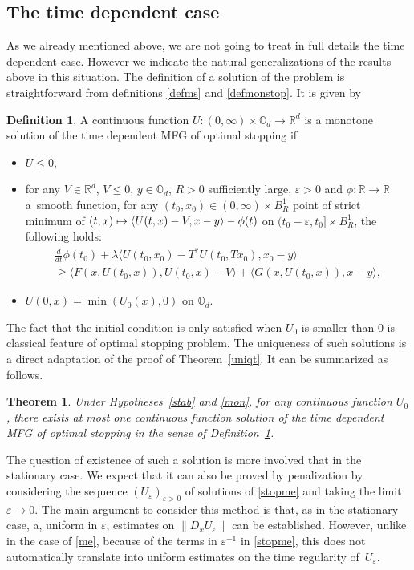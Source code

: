 \documentclass[10pt]{amsart}
\newcommand\mto{\mathchoice{\longmapsto}{\mapsto}{\mapsto}{\mapsto}}
\let\epsilon\varepsilon
\newtheorem{Theorem}{Theorem}[section]
\theoremstyle{definition}
\newtheorem{Def}{Definition}[section]
\begin{document}
\subsection{The time dependent case}
As we already mentioned above, we are not going to treat in full details the time dependent case. However we indicate the natural generalizations of the results above in this situation. The definition of a solution of the problem is straightforward from definitions \ref{defms} and \ref{defmonstop}. It is given by
\begin{Def}\label{defmstopt}
A continuous function $U: (0,\infty)\times \mathbb{O}_d \to \mathbb{R}^d$ is a monotone solution of the time dependent MFG of optimal stopping if
\begin{itemize}
\item $U \leq 0$,
\item for any $V \in \mathbb{R}^d$, $V \leq 0$, $y \in \mathbb{O}_d$, $R> 0$ sufficiently large, $\epsilon > 0$ and $\phi: \mathbb{R} \to \mathbb{R}$ a~smooth function, for any $(t_0,x_0)\in (0,\infty) \times B^1_R$ point of strict minimum of $(t,x) \mto \langle U(t,x)-V, x-y\rangle-\phi(t)$ on $(t_0-\epsilon, t_0] \times B^1_R$, the following holds:
\begin{multline}\label{testtstop}
\frac{d}{dt} \phi(t_0) + \lambda \langle U(t_0,x_0)-T^*U(t_0,Tx_0),x_0-y \rangle \\
\geq
\langle F(x,U(t_0,x)), U(t_0,x)-V\rangle+\langle G(x,U(t_0,x)), x-y \rangle,
\end{multline}
\item
$U(0,x) = \min(U_0(x),0) \text{ on } \mathbb{O}_d$.
\end{itemize}
\end{Def}
The fact that the initial condition is only satisfied when $U_0$ is smaller than $0$ is classical feature of optimal stopping problem. The uniqueness of such solutions is a direct adaptation of the proof of Theorem~\ref{uniqt}. It can be summarized as follows.
\begin{Theorem}
Under Hypotheses~\ref{stab} and \ref{mon}, for any continuous function $U_0$, there exists at most one continuous function solution of the time dependent MFG of optimal stopping in the sense of Definition~\ref{defmstopt}.
\end{Theorem}
The question of existence of such a solution is more involved that in the stationary case. We expect that it can also be proved by penalization by considering the sequence $(U_{\epsilon})_{\epsilon > 0}$ of solutions of \eqref{stopme} and taking the limit $\epsilon \to 0$. The main argument to consider this method is that, as in the stationary case, a, uniform in $\epsilon$, estimates on $\|D_x U_{\epsilon}\|$ can be established. However, unlike in the case of \eqref{me}, because of the terms in $\epsilon^{-1}$ in \eqref{stopme}, this does not automatically translate into uniform estimates on the time regularity of~$U_{\epsilon}$.
\end{document}
